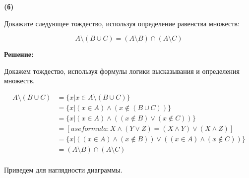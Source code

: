 \documentclass{article}
\begin{document}
\newpage

\textbf{(б)}

Докажите следующее тождество, используя определение равенства множеств:

$$A \setminus (B \cup C) = (A \setminus B) \cap (A \setminus C)$$

\textbf{Решение:}

Докажем тождество, используя формулы логики высказывания и определения множеств. 

\begin{equation} 
\begin{split}
A \setminus (B \cup C) & = \{x | x \in A \setminus (B \cup C) \} \\
 & = \{x | (x \in A) \wedge (x \notin (B \cup C)) \} \\
 & = \{x | (x \in A) \wedge ( (x \notin B) \vee (x \notin C)) \} \\
 & = [ use formula: X \wedge (Y \vee Z) = (X \wedge Y) \vee (X \wedge Z)]  \\ 
 & = \{x | ((x \in A) \wedge (x \notin B)) \vee ((x \in A) \wedge (x \notin C)) \} \\
 & = (A \setminus B) \cap (A \setminus C) \\
\end{split}
\end{equation}


Приведем для наглядности диаграммы. 
\end{document}
